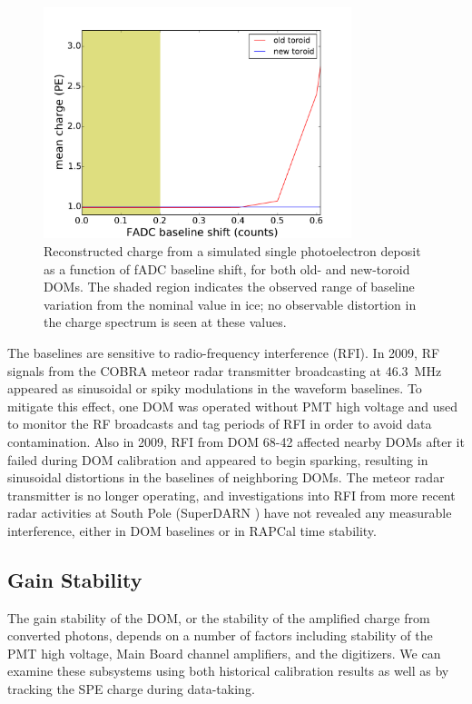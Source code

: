\begin{figure}[!h]
 \centering
 \includegraphics[width=0.8\textwidth]{graphics/dom/reliability/charge_fadcshift.pdf}
 \caption{Reconstructed charge from a simulated single photoelectron
   deposit as a function of fADC baseline shift, for both old- and
   new-toroid DOMs. The shaded region indicates the observed range of 
   baseline variation from the nominal value in ice; no observable
   distortion in the charge spectrum is seen at these values.}
 \label{fig:charge_fadcshift}
\end{figure}

The baselines are sensitive to radio-frequency interference (RFI). In
2009, RF signals from the COBRA meteor radar transmitter broadcasting at
46.3~MHz \cite{meteor_radar}
appeared as sinusoidal or spiky modulations in the waveform
baselines.  To mitigate this effect, one DOM was operated without PMT high
voltage and used to monitor the RF broadcasts and tag periods of RFI in
order to avoid data contamination.  Also
in 2009, RFI from DOM 68-42 affected nearby DOMs after it failed during DOM
calibration and appeared to begin sparking, resulting in sinusoidal distortions
in the baselines of neighboring DOMs. The meteor radar
transmitter is no longer operating, and investigations into RFI
from more recent radar activities at South Pole (SuperDARN
\cite{superdarn}) have not revealed any measurable interference, either in DOM
baselines or in RAPCal time stability. 

\subsection{\label{sec:gain_stability}Gain Stability}

The gain stability of the DOM, or the stability of the amplified charge
from converted photons, depends on a number of factors including stability
of the PMT high voltage, Main Board channel amplifiers, and the digitizers.
We can examine these subsystems using both historical calibration results
as well as by tracking the SPE charge during data-taking.

